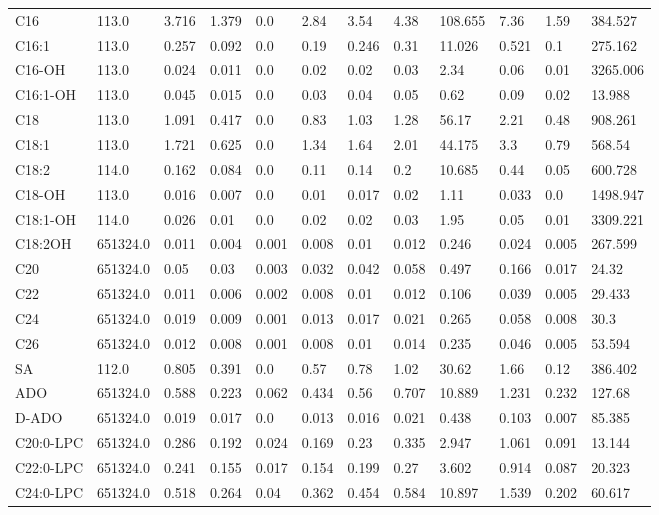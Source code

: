 \begin{tabular}{llllllllllll}
C16 & 113.0 & 3.716 & 1.379 & 0.0 & 2.84 & 3.54 & 4.38 & 108.655 & 7.36 & 1.59 & 384.527 \\
C16:1 & 113.0 & 0.257 & 0.092 & 0.0 & 0.19 & 0.246 & 0.31 & 11.026 & 0.521 & 0.1 & 275.162 \\
C16-OH & 113.0 & 0.024 & 0.011 & 0.0 & 0.02 & 0.02 & 0.03 & 2.34 & 0.06 & 0.01 & 3265.006 \\
C16:1-OH & 113.0 & 0.045 & 0.015 & 0.0 & 0.03 & 0.04 & 0.05 & 0.62 & 0.09 & 0.02 & 13.988 \\
C18 & 113.0 & 1.091 & 0.417 & 0.0 & 0.83 & 1.03 & 1.28 & 56.17 & 2.21 & 0.48 & 908.261 \\
C18:1 & 113.0 & 1.721 & 0.625 & 0.0 & 1.34 & 1.64 & 2.01 & 44.175 & 3.3 & 0.79 & 568.54 \\
C18:2 & 114.0 & 0.162 & 0.084 & 0.0 & 0.11 & 0.14 & 0.2 & 10.685 & 0.44 & 0.05 & 600.728 \\
C18-OH & 113.0 & 0.016 & 0.007 & 0.0 & 0.01 & 0.017 & 0.02 & 1.11 & 0.033 & 0.0 & 1498.947 \\
C18:1-OH & 114.0 & 0.026 & 0.01 & 0.0 & 0.02 & 0.02 & 0.03 & 1.95 & 0.05 & 0.01 & 3309.221 \\
C18:2OH & 651324.0 & 0.011 & 0.004 & 0.001 & 0.008 & 0.01 & 0.012 & 0.246 & 0.024 & 0.005 & 267.599 \\
C20 & 651324.0 & 0.05 & 0.03 & 0.003 & 0.032 & 0.042 & 0.058 & 0.497 & 0.166 & 0.017 & 24.32 \\
C22 & 651324.0 & 0.011 & 0.006 & 0.002 & 0.008 & 0.01 & 0.012 & 0.106 & 0.039 & 0.005 & 29.433 \\
C24 & 651324.0 & 0.019 & 0.009 & 0.001 & 0.013 & 0.017 & 0.021 & 0.265 & 0.058 & 0.008 & 30.3 \\
C26 & 651324.0 & 0.012 & 0.008 & 0.001 & 0.008 & 0.01 & 0.014 & 0.235 & 0.046 & 0.005 & 53.594 \\
SA & 112.0 & 0.805 & 0.391 & 0.0 & 0.57 & 0.78 & 1.02 & 30.62 & 1.66 & 0.12 & 386.402 \\
ADO & 651324.0 & 0.588 & 0.223 & 0.062 & 0.434 & 0.56 & 0.707 & 10.889 & 1.231 & 0.232 & 127.68 \\
D-ADO & 651324.0 & 0.019 & 0.017 & 0.0 & 0.013 & 0.016 & 0.021 & 0.438 & 0.103 & 0.007 & 85.385 \\
C20:0-LPC & 651324.0 & 0.286 & 0.192 & 0.024 & 0.169 & 0.23 & 0.335 & 2.947 & 1.061 & 0.091 & 13.144 \\
C22:0-LPC & 651324.0 & 0.241 & 0.155 & 0.017 & 0.154 & 0.199 & 0.27 & 3.602 & 0.914 & 0.087 & 20.323 \\
C24:0-LPC & 651324.0 & 0.518 & 0.264 & 0.04 & 0.362 & 0.454 & 0.584 & 10.897 & 1.539 & 0.202 & 60.617 \\

\end{tabular}
